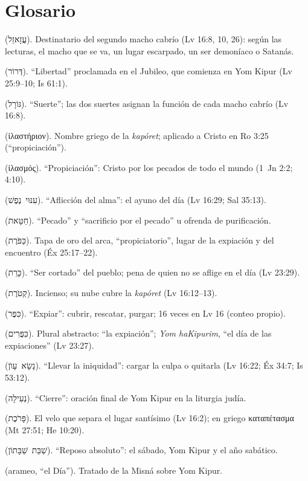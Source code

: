 \documentclass[11pt,letterpaper]{article}
\newcommand{\heb}[1]{\mbox{\foreignlanguage{hebrew}{#1}}}
\newcommand{\grc}[1]{\foreignlanguage{ancientgreek}{#1}}
\begin{document}
\section*{Glosario}
\begin{description}\setlength{\itemsep}{2pt}
\item[Azazel] (\heb{עֲזָאזֵל}). Destinatario del segundo macho cabrío (Lv 16:8, 10, 26): según las lecturas, el macho que se va, un lugar escarpado, un ser demoníaco o Satanás.
\item[\emph{Derór}] (\heb{דְּרוֹר}). ``Libertad'' proclamada en el Jubileo, que comienza en Yom Kipur (Lv 25:9--10; Is 61:1).
\item[\emph{Goral}] (\heb{גּוֹרָל}). ``Suerte''; las dos suertes asignan la función de cada macho cabrío (Lv 16:8).
\item[\emph{Hilastérion}] (\grc{ἱλαστήριον}). Nombre griego de la \emph{kapóret}; aplicado a Cristo en Ro 3:25 (``propiciación'').
\item[\emph{Hilasmós}] (\grc{ἱλασμός}). ``Propiciación'': Cristo por los pecados de todo el mundo (1~Jn 2:2; 4:10).
\item[\emph{Inui néfesh}] (\heb{עִנּוּי נֶפֶשׁ}). ``Aflicción del alma'': el ayuno del día (Lv 16:29; Sal 35:13).
\item[\emph{Jatat}] (\heb{חַטָּאת}). ``Pecado'' y ``sacrificio por el pecado'' u ofrenda de purificación.
\item[\emph{Kapóret}] (\heb{כַּפֹּרֶת}). Tapa de oro del arca, ``propiciatorio'', lugar de la expiación y del encuentro (Éx 25:17--22).
\item[\emph{Karet}] (\heb{כָּרֵת}). ``Ser cortado'' del pueblo; pena de quien no se aflige en el día (Lv 23:29).
\item[\emph{Ketóret}] (\heb{קְטֹרֶת}). Incienso; su nube cubre la \emph{kapóret} (Lv 16:12--13).
\item[\emph{Kipper}] (\heb{כִּפֶּר}). ``Expiar'': cubrir, rescatar, purgar; 16 veces en Lv 16 (conteo propio).
\item[\emph{Kipurim}] (\heb{כִּפֻּרִים}). Plural abstracto: ``la expiación''; \emph{Yom haKipurim}, ``el día de las expiaciones'' (Lv 23:27).
\item[\emph{Nasá avón}] (\heb{נָשָׂא עָוֺן}). ``Llevar la iniquidad'': cargar la culpa o quitarla (Lv 16:22; Éx 34:7; Is 53:12).
\item[\emph{Neilá}] (\heb{נְעִילָה}). ``Cierre'': oración final de Yom Kipur en la liturgia judía.
\item[\emph{Parójet}] (\heb{פָּרֹכֶת}). El velo que separa el lugar santísimo (Lv 16:2); en griego \grc{καταπέτασμα} (Mt 27:51; He 10:20).
\item[\emph{Shabat shabatón}] (\heb{שַׁבַּת שַׁבָּתוֹן}). ``Reposo absoluto'': el sábado, Yom Kipur y el año sabático.
\item[\emph{Yomá}] (arameo, ``el Día''). Tratado de la Misná sobre Yom Kipur.
\end{description}
\end{document}
